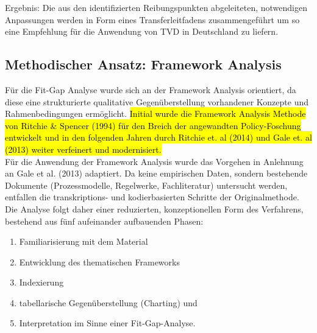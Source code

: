 Ergebnis: Die aus den identifizierten Reibungspunkten abgeleiteten, notwendigen Anpassungen werden in Form eines Transferleitfadens zusammengeführt um so eine Empfehlung für die Anwendung von \ac{TVD} in Deutschland zu liefern.\\

\subsection{Methodischer Ansatz: Framework Analysis}
\label{sec: 3.4.2}

Für die Fit-Gap Analyse wurde sich an der Framework Analysis orientiert, da diese eine strukturierte qualitative Gegenüberstellung vorhandener Konzepte und Rahmenbedingungen ermöglicht. \hl{Initial wurde die Framework Analysis Methode von Ritchie \& Spencer (1994) für den Breich der angewandten Policy-Foschung entwickelt\autocite[Vgl.][S.2]{gale_using_2013} und in den folgenden Jahren durch Ritchie et. al (2014) und Gale et. al (2013) weiter verfeinert und modernisiert.}\\
Für die Anwendung der Framework Analysis wurde das Vorgehen in Anlehnung an Gale et al. (2013) adaptiert.
Da keine empirischen Daten, sondern bestehende Dokumente (Prozessmodelle, Regelwerke, Fachliteratur) untersucht werden, entfallen die transkriptions- und kodierbasierten Schritte der Originalmethode.
Die Analyse folgt daher einer reduzierten, konzeptionellen Form des Verfahrens, bestehend aus fünf aufeinander aufbauenden Phasen:
\begin{enumerate}
    \item Familiarisierung mit dem Material
    \item Entwicklung des thematischen Frameworks
    \item Indexierung
    \item tabellarische Gegenüberstellung (Charting) und
    \item Interpretation im Sinne einer Fit-Gap-Analyse.
\end{enumerate}
%
%
%  
%
